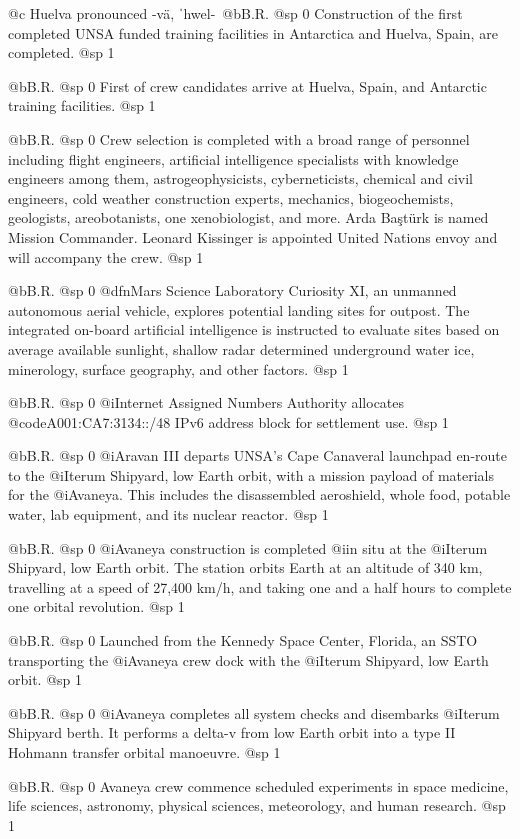 @c Huelva pronounced -vä, ˈhwel-\
@b{B.R.}
@sp 0
Construction of the first completed UNSA funded training facilities in Antarctica and Huelva, Spain, are completed.
@sp 1

@b{B.R.}
@sp 0
First of crew candidates arrive at Huelva, Spain, and Antarctic training facilities.
@sp 1

@b{B.R.}
@sp 0
Crew selection is completed with a broad range of personnel including flight engineers, artificial intelligence specialists with knowledge engineers among them, astrogeophysicists, cyberneticists, chemical and civil engineers, cold weather construction experts, mechanics, biogeochemists, geologists, areobotanists, one xenobiologist, and more. Arda Baştürk is named Mission Commander. Leonard Kissinger is appointed United Nations envoy and will accompany the crew.
@sp 1

@b{B.R.}
@sp 0
@dfn{Mars Science Laboratory Curiosity XI}, an unmanned autonomous aerial vehicle, explores potential landing sites for outpost. The integrated on-board artificial intelligence is instructed to evaluate sites based on average available sunlight, shallow radar determined underground water ice, minerology, surface geography, and other factors.
@sp 1

@b{B.R.}
@sp 0
@i{Internet Assigned Numbers Authority} allocates @code{A001:CA7:3134::/48} IPv6 address block for settlement use. 
@sp 1

@b{B.R.}
@sp 0
@i{Aravan III} departs UNSA's Cape Canaveral launchpad en-route to the @i{Iterum Shipyard}, low Earth orbit, with a mission payload of materials for the @i{Avaneya}. This includes the disassembled aeroshield, whole food, potable water, lab equipment, and its nuclear reactor.
@sp 1

@b{B.R.}
@sp 0
@i{Avaneya} construction is completed @i{in situ} at the @i{Iterum Shipyard}, low Earth orbit. The station orbits Earth at an altitude of 340 km, travelling at a speed of 27,400 km/h, and taking one and a half hours to complete one orbital revolution.
@sp 1

@b{B.R.}
@sp 0
Launched from the Kennedy Space Center, Florida, an SSTO transporting the @i{Avaneya} crew dock with the @i{Iterum Shipyard}, low Earth orbit.
@sp 1

@b{B.R.}
@sp 0
@i{Avaneya} completes all system checks and disembarks @i{Iterum Shipyard} berth. It performs a delta-v from low Earth orbit into a type II Hohmann transfer orbital manoeuvre.
@sp 1

@b{B.R.}
@sp 0
Avaneya crew commence scheduled experiments in space medicine, life sciences, astronomy, physical sciences, meteorology, and human research.
@sp 1

